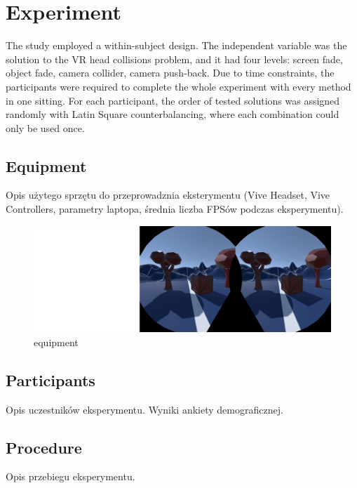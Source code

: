 \section{Experiment}

The study employed a within-subject design. The independent variable was the solution to the VR head collisions problem, and it had four levels: screen fade, object fade, camera collider, camera push-back. Due to time constraints, the participants were required to complete the whole experiment with every method in one sitting. For each participant, the order of tested solutions was assigned randomly with Latin Square counterbalancing, where each combination could only be used once.

\subsection{Equipment}

Opis użytego sprzętu do przeprowadznia eksterymentu (Vive Headset, Vive Controllers, parametry laptopa, średnia liczba FPSów podczas eksperymentu).

\begin{figure}[p]
\centering
\includegraphics[width=1\textwidth]{img/equipment.png}
\caption{equipment}
\label{fig:equipment}
\end{figure}

\subsection{Participants}

Opis uczestników eksperymentu. Wyniki ankiety demograficznej.

\subsection{Procedure}

Opis przebiegu eksperymentu.